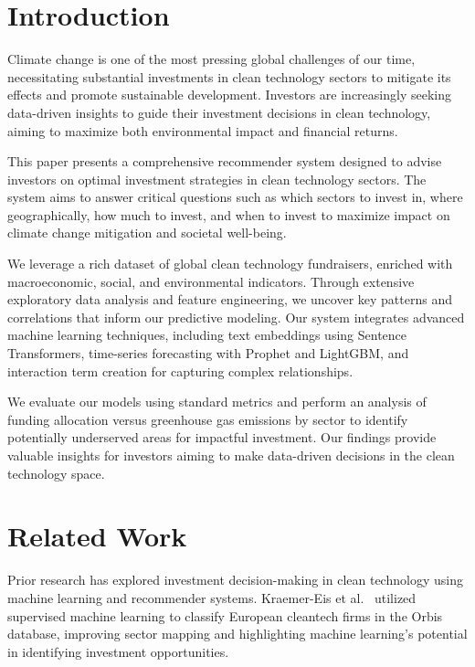 \documentclass[sigconf]{acmart}
\begin{document}

\maketitle

\section{Introduction}

Climate change is one of the most pressing global challenges of our time, necessitating substantial investments in clean technology sectors to mitigate its effects and promote sustainable development. Investors are increasingly seeking data-driven insights to guide their investment decisions in clean technology, aiming to maximize both environmental impact and financial returns.

This paper presents a comprehensive recommender system designed to advise investors on optimal investment strategies in clean technology sectors. The system aims to answer critical questions such as which sectors to invest in, where geographically, how much to invest, and when to invest to maximize impact on climate change mitigation and societal well-being.

We leverage a rich dataset of global clean technology fundraisers, enriched with macroeconomic, social, and environmental indicators. Through extensive exploratory data analysis and feature engineering, we uncover key patterns and correlations that inform our predictive modeling. Our system integrates advanced machine learning techniques, including text embeddings using Sentence Transformers, time-series forecasting with Prophet and LightGBM, and interaction term creation for capturing complex relationships.

We evaluate our models using standard metrics and perform an analysis of funding allocation versus greenhouse gas emissions by sector to identify potentially underserved areas for impactful investment. Our findings provide valuable insights for investors aiming to make data-driven decisions in the clean technology space.

\section{Related Work}

Prior research has explored investment decision-making in clean technology using machine learning and recommender systems. Kraemer-Eis et al.~\cite{KraemerEisBotsariLangPal2023} utilized supervised machine learning to classify European cleantech firms in the Orbis database, improving sector mapping and highlighting machine learning's potential in identifying investment opportunities.
\end{document}
